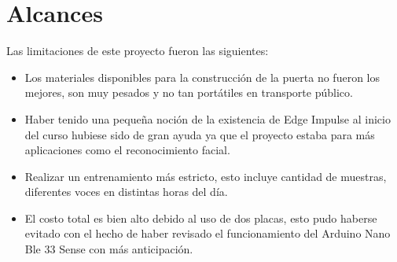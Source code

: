 \section{Alcances}
Las limitaciones de este proyecto fueron las siguientes:
\begin{itemize}
\item Los materiales disponibles para la construcción de la puerta no fueron los mejores, son muy pesados y no tan portátiles en transporte público.
\item Haber tenido una pequeña noción de la existencia de Edge Impulse al inicio del curso hubiese sido de gran ayuda ya que el proyecto estaba para más aplicaciones como el reconocimiento facial.
\item Realizar un entrenamiento más estricto, esto incluye cantidad de muestras, diferentes voces en distintas horas del día.
\item El costo total es bien alto debido al uso de dos placas, esto pudo haberse evitado con el hecho de haber revisado el funcionamiento del Arduino Nano Ble 33 Sense con más anticipación.
\end{itemize}